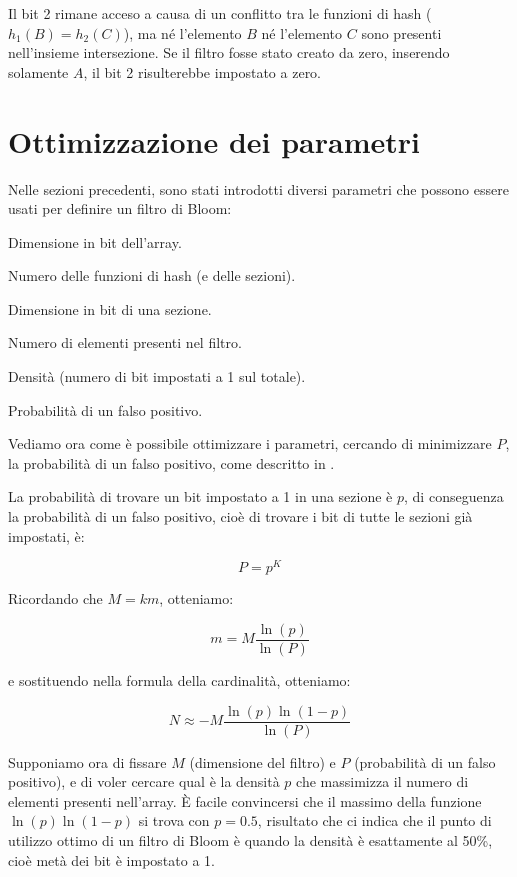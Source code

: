 Il bit 2 rimane acceso a causa di un conflitto tra le funzioni di hash ($h_1(B) = h_2(C)$), ma
né l'elemento $B$ né l'elemento $C$ sono presenti nell'insieme intersezione. Se il filtro fosse
stato creato da zero, inserendo solamente $A$, il bit 2 risulterebbe impostato a zero.

\section{Ottimizzazione dei parametri}
\label{sec:bloomparms}

Nelle sezioni precedenti, sono stati introdotti diversi parametri che possono essere usati
per definire un filtro di Bloom:

\begin{description}[labelindent=2\parindent,labelwidth=3em]
	\item[$M$] Dimensione in bit dell'array.
	\item[$K$] Numero delle funzioni di hash (e delle sezioni).
	\item[$m$] Dimensione in bit di una sezione.
	\item[$N$] Numero di elementi presenti nel filtro.
	\item[$p$] Densità (numero di bit impostati a 1 sul totale).
	\item[$P$] Probabilità di un falso positivo.
\end{description}

Vediamo ora come è possibile ottimizzare i parametri, cercando di minimizzare $P$, la probabilità
di un falso positivo, come descritto in \cite{bloom-scalable}.

La probabilità di trovare un bit impostato a 1 in una sezione è $p$, di conseguenza la probabilità 
di un falso positivo, cioè di trovare i bit di tutte le sezioni già impostati, è:

$$ P = p^K $$

Ricordando che $M=km$, otteniamo:

$$ m = M\frac{\ln(p)}{\ln(P)} $$

e sostituendo nella formula della cardinalità, otteniamo:

$$ N \approx -M\frac{\ln(p)\ln(1-p)}{\ln(P)} $$

Supponiamo ora di fissare $M$ (dimensione del filtro) e $P$ (probabilità di un falso positivo), e di
voler cercare qual è la densità $p$ che massimizza il numero di elementi presenti nell'array. È
facile convincersi che il massimo della funzione $\ln(p)\ln(1-p)$ si trova con $p=0.5$, risultato
che ci indica che il punto di utilizzo ottimo di un filtro di Bloom è quando la densità è
esattamente al 50\%, cioè metà dei bit è impostato a 1.

